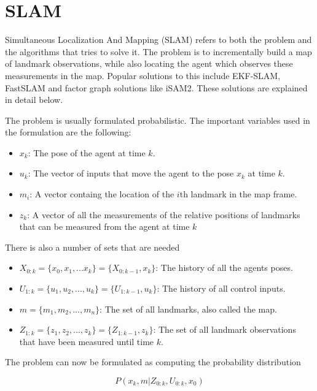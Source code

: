\section{SLAM}

Simultaneous Localization And Mapping (SLAM)\cite{FirstSLAMMention}\cite{SLAMIntro} refers to both the problem and the algorithms that tries to solve it. The problem is to incrementally build a map of landmark observations, while also locating the agent which observes these measurements in the map. Popular solutions to this include EKF-SLAM\cite{EKFSLAM}, FastSLAM\cite{FastSLAM1} and factor graph\cite{Dellaert} solutions like iSAM2\cite{iSAM2}. These solutions are explained in detail below. 

The problem is usually formulated probabilistic. The important variables used in the formulation are the following:

\begin{itemize}
    \item $x_k$: The pose of the agent at time $k$. 
    \item $u_k$: The vector of inputs that move the agent to the pose $x_k$ at time $k$.
    \item $m_i$: A vector containg the location of the $i$th landmark in the map frame. 
    \item $z_k$: A vector of all the measurements of the relative positions of landmarks that can be measured from the agent at time $k$ 
\end{itemize}

There is also a number of sets that are needed

\begin{itemize}
    \item $X_{0:k} = \{x_0,x_1,...x_k\} = \{X_{0:k-1},x_k\}$: The history of all the agents poses.
    \item $U_{1:k} = \{u_1,u_2,...,u_k\} = \{U_{1:k-1},u_k\}$: The history of all control inputs.
    \item $m=\{m_1,m_2,...,m_n\}$: The set of all landmarks, also called the map.
    \item $Z_{1:k}=\{z_1,z_2,...,z_k\} = \{Z_{1:k-1},z_k\}$: The set of all landmark observations that have been measured until time $k$.
\end{itemize}

The problem can now be formulated as computing the probability distribution 

\begin{equation}
    P(x_k,m|Z_{0:k},U_{0:k},x_0)
\end{equation}


